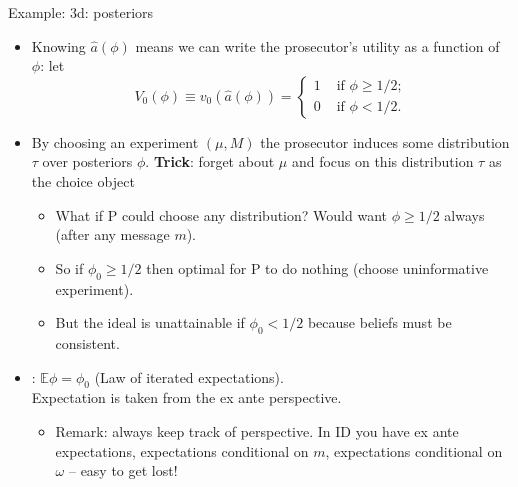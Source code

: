\documentclass[english,10pt
,aspectratio=169
]{beamer}
\begin{document}
\begin{frame}{Example: 3d: posteriors}
\begin{itemize}
	\item Knowing $\hat{a}(\phi)$ means we can write the prosecutor's utility as a function of $\phi$: let
	\vspace{-0.5em}
	\begin{equation*}
		V_0 (\phi) \equiv v_0(\hat{a}(\phi)) = \begin{cases}
			1 & \text{ if } \phi \geq 1/2;
			\\
			0 & \text{ if } \phi < 1/2.
		\end{cases}
	\end{equation*}
	\vspace{-1.5em}
	\pause
	\item By choosing an experiment $(\mu,M)$ the prosecutor induces some distribution $\tau$ over posteriors $\phi$. \textbf{Trick}: forget about $\mu$ and focus on this distribution $\tau$ as the choice object
	\begin{itemize}
		\item What if P could choose any distribution? Would want $\phi \geq 1/2$ always (after any message $m$).
		\item So if $\phi_0 \geq 1/2$ then optimal for P to do nothing (choose uninformative experiment).
		\item But the ideal is unattainable if $\phi_0 < 1/2$ because beliefs must be \alert{consistent}.
	\end{itemize}
	\pause
	\item {}: $\mathbb{E} \phi = \phi_0$ (Law of iterated expectations). \\
	Expectation is taken from the ex ante perspective.
	\begin{itemize}
		\item \alert{Remark}: always keep track of perspective. In ID you have ex ante expectations, expectations conditional on $m$, expectations conditional on $\omega$ -- easy to get lost!
	\end{itemize}
\end{itemize}
\end{frame}
\end{document}

